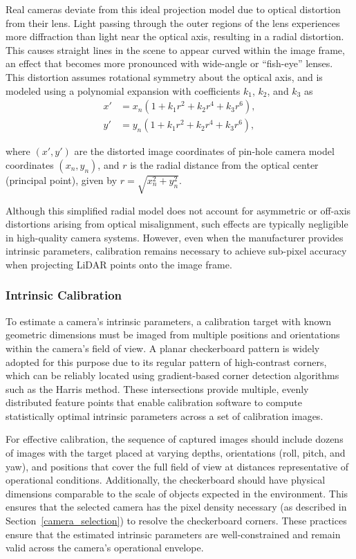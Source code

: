 \documentclass{erauthesis}
\begin{document}
Real cameras deviate from this ideal projection model due to optical distortion from their lens.  
Light passing through the outer regions of the lens experiences more diffraction than light near the optical axis, resulting in a radial distortion.
This causes straight lines in the scene to appear curved within the image frame, an effect that becomes more pronounced with wide-angle or “fish-eye” lenses.  
This distortion assumes rotational symmetry about the optical axis, and is modeled using a polynomial expansion with coefficients $k_1$, $k_2$, and $k_3$ as
\begin{equation}
    \begin{split}
        x' &= x_n(1 + k_1 r^2 + k_2 r^4 + k_3 r^6), \\
        y' &= y_n(1 + k_1 r^2 + k_2 r^4 + k_3 r^6),
    \end{split}
\end{equation}

where $(x', y')$ are the distorted image coordinates of pin-hole camera model coordinates $(x_n, y_n)$, and $r$ is the radial distance from the optical center (principal point), given by $r = \sqrt{x_n^2 + y_n^2}$. 

Although this simplified radial model does not account for asymmetric or off-axis distortions arising from optical misalignment, such effects are typically negligible in high-quality camera systems.
However, even when the manufacturer provides intrinsic parameters, calibration remains necessary to achieve sub-pixel accuracy when projecting LiDAR points onto the image frame.

\subsubsection{Intrinsic Calibration} \label{intrinsic_calib}

To estimate a camera's intrinsic parameters, a calibration target with known geometric dimensions must be imaged from multiple positions and orientations within the camera’s field of view.  
A planar checkerboard pattern is widely adopted for this purpose due to its regular pattern of high-contrast corners, which can be reliably located using gradient-based corner detection algorithms such as the Harris method.  
These intersections provide multiple, evenly distributed feature points that enable calibration software to compute statistically optimal intrinsic parameters across a set of calibration images.

For effective calibration, the sequence of captured images should include dozens of images with the target placed at varying depths, orientations (roll, pitch, and yaw), and positions that cover the full field of view at distances representative of operational conditions.
Additionally, the checkerboard should have physical dimensions comparable to the scale of objects expected in the environment. This ensures that the selected camera has the pixel density necessary (as described in Section~\ref{camera_selection}) to resolve the checkerboard corners.
These practices ensure that the estimated intrinsic parameters are well-constrained and remain valid across the camera’s operational envelope.
\end{document}
